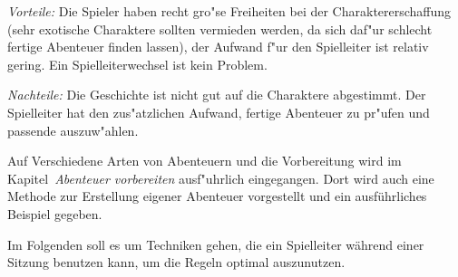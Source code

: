 \begin{description}
  \emph{Vorteile:} Die Spieler haben recht gro"se Freiheiten bei der Charaktererschaffung (sehr exotische Charaktere sollten vermieden werden, da sich daf"ur schlecht fertige Abenteuer finden lassen), der Aufwand f"ur den Spielleiter ist relativ gering. Ein Spielleiterwechsel ist kein Problem.

  \emph{Nachteile:} Die Geschichte ist nicht gut auf die Charaktere abgestimmt. Der Spielleiter hat den zus"atzlichen Aufwand, fertige Abenteuer zu pr"ufen und passende auszuw"ahlen.
\end{description}

Auf Verschiedene Arten von Abenteuern und die Vorbereitung wird im Kapitel~\emph{Abenteuer vorbereiten} ausf"uhrlich eingegangen. Dort wird auch eine Methode zur Erstellung eigener Abenteuer vorgestellt und ein ausführliches Beispiel gegeben.

Im Folgenden soll es um Techniken gehen, die ein Spielleiter während einer Sitzung benutzen kann, um die Regeln optimal auszunutzen.



